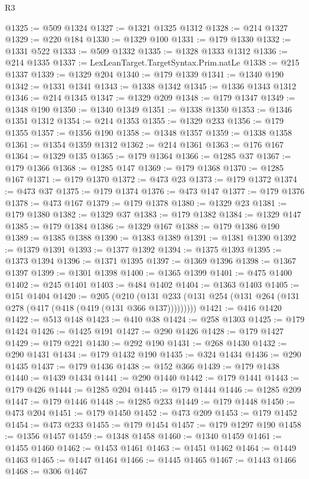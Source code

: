 \begin{lexlean}{R3}
\begin{coremodule}
@1325 := @509 @1324
@1327 := @1321 @1325 @1312
@1328 := @214 @1327
@1329 := @220 @184
@1330 := @1329 @100
@1331 := @179 @1330
@1332 := @1331 @522
@1333 := @509 @1332
@1335 := @1328 @1333 @1312
@1336 := @214 @1335
@1337 := LexLeanTarget.TargetSyntax.Prim.natLe
@1338 := @215 @1337
@1339 := @1329 @204
@1340 := @179 @1339
@1341 := @1340 @190
@1342 := @1331 @1341
@1343 := @1338 @1342
@1345 := @1336 @1343 @1312
@1346 := @214 @1345
@1347 := @1329 @209
@1348 := @179 @1347
@1349 := @1348 @190
@1350 := @1340 @1349
@1351 := @1338 @1350
@1353 := @1346 @1351 @1312
@1354 := @214 @1353
@1355 := @1329 @233
@1356 := @179 @1355
@1357 := @1356 @190
@1358 := @1348 @1357
@1359 := @1338 @1358
@1361 := @1354 @1359 @1312
@1362 := @214 @1361
@1363 := @176 @167
@1364 := @1329 @135
@1365 := @179 @1364
@1366 := @1285 @37
@1367 := @179 @1366
@1368 := @1285 @147
@1369 := @179 @1368
@1370 := @1285 @167
@1371 := @179 @1370
@1372 := @473 @23
@1373 := @179 @1372
@1374 := @473 @37
@1375 := @179 @1374
@1376 := @473 @147
@1377 := @179 @1376
@1378 := @473 @167
@1379 := @179 @1378
@1380 := @1329 @23
@1381 := @179 @1380
@1382 := @1329 @37
@1383 := @179 @1382
@1384 := @1329 @147
@1385 := @179 @1384
@1386 := @1329 @167
@1388 := @179 @1386 @190
@1389 := @1385 @1388
@1390 := @1383 @1389
@1391 := @1381 @1390
@1392 := @1379 @1391
@1393 := @1377 @1392
@1394 := @1375 @1393
@1395 := @1373 @1394
@1396 := @1371 @1395
@1397 := @1369 @1396
@1398 := @1367 @1397
@1399 := @1301 @1398
@1400 := @1365 @1399
@1401 := @475 @1400
@1402 := @245 @1401
@1403 := @484 @1402
@1404 := @1363 @1403
@1405 := @151 @1404
@1420 := @205
    (@210 (@131 @233 (@131 @254 (@131 @264 (@131 @278 (@417 (@418 (@419 (@131 @366 @137)))))))))
@1421 := @416 @1420
@1422 := @513 @148
@1423 := @410 @38
@1424 := @258 @1303
@1425 := @179 @1424
@1426 := @1425 @191
@1427 := @290 @1426
@1428 := @179 @1427
@1429 := @179 @221
@1430 := @292 @190
@1431 := @268 @1430
@1432 := @290 @1431
@1434 := @179 @1432 @190
@1435 := @324 @1434
@1436 := @290 @1435
@1437 := @179 @1436
@1438 := @152 @366
@1439 := @179 @1438
@1440 := @1439 @1434
@1441 := @290 @1440
@1442 := @179 @1441
@1443 := @179 @426
@1444 := @1285 @204
@1445 := @179 @1444
@1446 := @1285 @209
@1447 := @179 @1446
@1448 := @1285 @233
@1449 := @179 @1448
@1450 := @473 @204
@1451 := @179 @1450
@1452 := @473 @209
@1453 := @179 @1452
@1454 := @473 @233
@1455 := @179 @1454
@1457 := @179 @1297 @190
@1458 := @1356 @1457
@1459 := @1348 @1458
@1460 := @1340 @1459
@1461 := @1455 @1460
@1462 := @1453 @1461
@1463 := @1451 @1462
@1464 := @1449 @1463
@1465 := @1447 @1464
@1466 := @1445 @1465
@1467 := @1443 @1466
@1468 := @306 @1467

\end{coremodule}
\end{lexlean}
